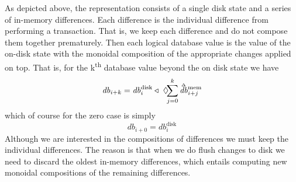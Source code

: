 \documentclass[11pt,a4paper]{article}
\newcommand\deltavar[1]{\accentset{\Delta}{#1}}
\begin{document}
\begin{center}
\end{center}
As depicted above, the representation consists of a single disk
state and a series of in-memory differences. Each difference is the individual
difference from performing a transaction. That is, we keep each difference and
do not compose them together prematurely. Then each logical database value is
the value of the on-disk state with the monoidal composition of the appropriate
changes applied on top. That is, for the k\textsuperscript{th} database value
beyond the on disk state we have
\[
\mathit{db}_{i+k}
= \mathit{db}^{\mathrm{disk}}_i \triangleleft ~
            \displaystyle\Diamond\hspace{-4pt}\sum_{j=0}^k{\deltavar{\mathit{db}}^{\mathrm{mem}}_{i+j}}
\]
which of course for the zero case is simply
\[
\mathit{db}_{i+0}
= \mathit{db}^{\mathrm{disk}}_i
\]
Although we are interested in the compositions of differences we must keep the
individual differences. The reason is that when we do flush changes to disk we
need to discard the oldest in-memory differences, which entails computing new
monoidal compositions of the remaining differences.
\end{document}
